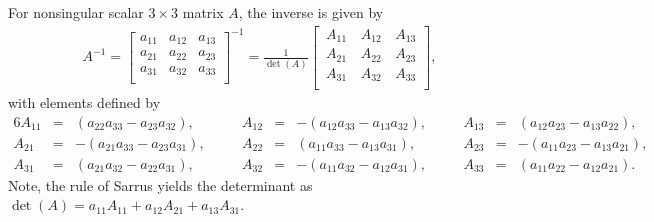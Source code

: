 \documentclass[a4paper,10pt]{article}
\begin{document}
For nonsingular scalar $3\times 3$ matrix $A$, the inverse is given by 
%
\begin{align}
{A}^{-1} = \begin{bmatrix}
a_{11} & a_{12} & a_{13}\\ a_{21} & a_{22} & a_{23} \\ a_{31} & a_{32} & a_{33}\\
\end{bmatrix}^{-1} =
\frac{1}{\det({A})} \begin{bmatrix}
\, A_{11} & \, A_{12} & \,A_{13} \\ \, A_{21} & \, A_{22} & \,A_{23} \\ \, A_{31} & \,A_{32} & \, A_{33}\\
\end{bmatrix},\label{eq:3inv}
\end{align}
%
with elements defined by
%
\begin{alignat*}{6}
A_{11} &={}&  (a_{22}a_{33} - a_{23}a_{32}), &\quad&
    A_{12} &={}& -(a_{12}a_{33} - a_{13}a_{32}), &\quad&
    A_{13} &={}&  (a_{12}a_{23} - a_{13}a_{22}), \\
A_{21} &={}& -(a_{21}a_{33} - a_{23}a_{31}), &\quad&
    A_{22} &={}&  (a_{11}a_{33} - a_{13}a_{31}), &\quad&
    A_{23} &={}& -(a_{11}a_{23} - a_{13}a_{21}), \\
A_{31} &={}&  (a_{21}a_{32} - a_{22}a_{31}), &\quad&
    A_{32} &={}& -(a_{11}a_{32} - a_{12}a_{31}), &\quad&
    A_{33} &={}&  (a_{11}a_{22} - a_{12}a_{21}).
\end{alignat*}
%
Note, the rule of Sarrus yields the determinant as $\det({A}) = a_{11}A_{11}+a_{12}A_{21}+a_{13}A_{31}$.
\end{document}
